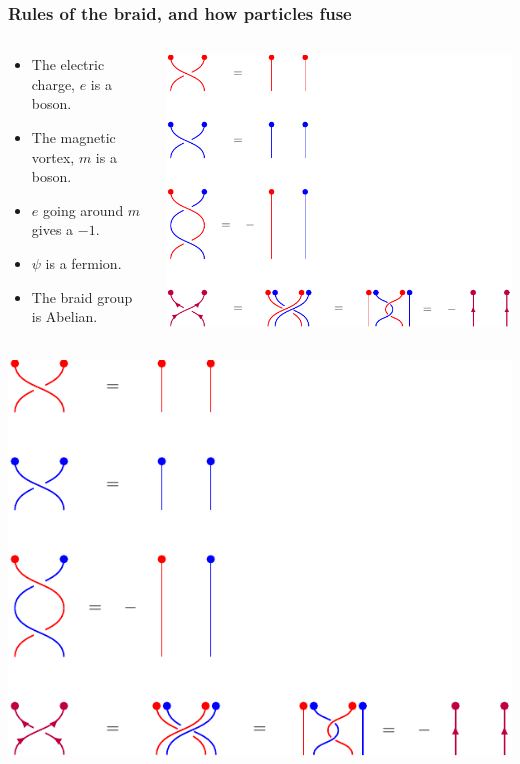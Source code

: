 \documentclass{beamer}
\renewcommand{\(}{\left(}
\renewcommand{\)}{\right)}
\renewcommand{\[}{\left[}
\renewcommand{\]}{\right]}
\begin{document}
\begin{frame}
    \frametitle{Rules of the braid, and how particles fuse}
    \begin{columns}
        \begin{column}{0.6\textwidth}
            \begin{itemize}
                \item The electric charge, $e$ is a boson. 
                \item The magnetic vortex, $m$ is a boson. 
                \item $e$ going around $m$ gives a $-1$. 
                \item $\psi$ is a fermion.
                \item The braid group is Abelian. 
            \end{itemize}
        \end{column}
        \begin{column}{0.4\textwidth}
            \includegraphics[scale=0.9, trim=0 60 170 0, clip]{rules_of_braiding.pdf}
        \end{column}
    \end{columns}
    \vspace{10pt}
    \includegraphics[scale=1, trim=0 0 0 190, clip]{rules_of_braiding.pdf}
\end{frame}
\end{document}
